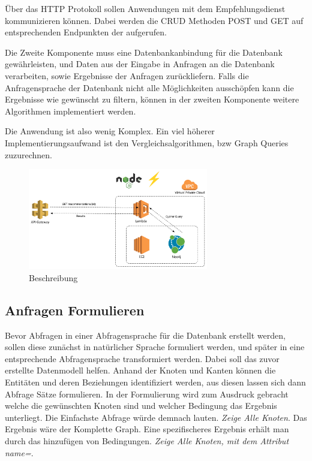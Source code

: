 Über das HTTP Protokoll sollen Anwendungen mit dem Empfehlungsdienst kommunizieren können. Dabei werden die CRUD Methoden POST und GET auf entsprechenden Endpunkten der aufgerufen. 

Die Zweite Komponente muss eine Datenbankanbindung für die Datenbank gewährleisten, und Daten aus der Eingabe in Anfragen an die Datenbank verarbeiten, sowie Ergebnisse der Anfragen zurückliefern. Falls die Anfragensprache der Datenbank nicht alle Möglichkeiten ausschöpfen kann die Ergebnisse wie gewünscht zu filtern, können in der zweiten Komponente weitere Algorithmen implementiert werden.

Die Anwendung ist also wenig Komplex. Ein viel höherer Implementierungsaufwand ist den Vergleichsalgorithmen, bzw Graph Queries zuzurechnen. 

\begin{figure}[htb]
 \centering
 \includegraphics[width=0.7\textwidth,angle=0]{abb/Architecture}
 \caption[Beschreibung]{Beschreibung}
\label{fig:Beschreibung}
\end{figure}



\subsection{Anfragen Formulieren}

Bevor Abfragen in einer Abfragensprache für die Datenbank erstellt werden, sollen diese zunächst in natürlicher Sprache formuliert werden, und später in eine entsprechende Abfragensprache  transformiert werden. Dabei soll das zuvor erstellte  Datenmodell helfen. Anhand der Knoten und Kanten können die Entitäten und deren Beziehungen identifiziert werden, aus diesen lassen sich dann Abfrage Sätze formulieren. In der Formulierung wird zum Ausdruck gebracht welche die gewünschten Knoten sind und welcher Bedingung das Ergebnis unterliegt. Die Einfachste Abfrage würde demnach lauten. \textit{Zeige Alle Knoten}. Das Ergebnis wäre der Komplette Graph. Eine spezifischeres Ergebnis erhält man durch das hinzufügen von Bedingungen. \textit{  Zeige Alle Knoten, mit dem Attribut {name=\textbf{\texttt{}}}}. 


